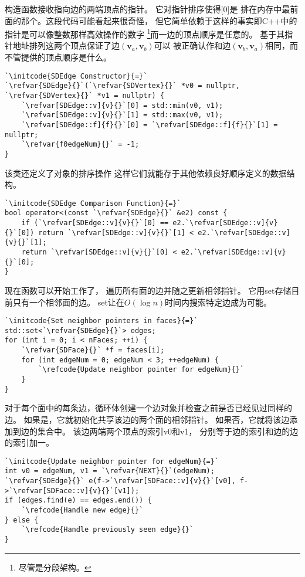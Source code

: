 构造函数接收指向边的两端顶点的指针。
它对指针排序使得{\ttfamily{}[0]}是
排在内存中最前面的那个。这段代码可能看起来很奇怪，
但它简单依赖于这样的事实即C++中的指针是可以像整数那样高效操作的数字
\footnote{尽管是分段架构。}而一边的顶点顺序是任意的。
基于其指针地址排列这两个顶点保证了边$(\bm v_a,\bm v_b)$可以
被正确认作和边$(\bm v_b,\bm v_a)$相同，而不管提供的顶点顺序是什么。
\begin{lstlisting}
`\initcode{SDEdge Constructor}{=}`
`\refvar{SDEdge}{}`(`\refvar{SDVertex}{}` *v0 = nullptr, `\refvar{SDVertex}{}` *v1 = nullptr) {
    `\refvar[SDEdge::v]{v}{}`[0] = std::min(v0, v1);
    `\refvar[SDEdge::v]{v}{}`[1] = std::max(v0, v1);
    `\refvar[SDEdge::f]{f}{}`[0] = `\refvar[SDEdge::f]{f}{}`[1] = nullptr;
    `\refvar{f0edgeNum}{}` = -1;
}
\end{lstlisting}

该类还定义了对象的排序操作
这样它们就能存于其他依赖良好顺序定义的数据结构。
\begin{lstlisting}
`\initcode{SDEdge Comparison Function}{=}`
bool operator<(const `\refvar{SDEdge}{}` &e2) const {
    if (`\refvar[SDEdge::v]{v}{}`[0] == e2.`\refvar[SDEdge::v]{v}{}`[0]) return `\refvar[SDEdge::v]{v}{}`[1] < e2.`\refvar[SDEdge::v]{v}{}`[1];
    return `\refvar[SDEdge::v]{v}{}`[0] < e2.`\refvar[SDEdge::v]{v}{}`[0];
}
\end{lstlisting}

现在函数可以开始工作了，
遍历所有面的边并随之更新相邻指针。
它用{\ttfamily set}存储目前只有一个相邻面的边。
{\ttfamily set}让在$O(\log{n})$时间内搜索特定边成为可能。
\begin{lstlisting}
`\initcode{Set neighbor pointers in faces}{=}`
std::set<`\refvar{SDEdge}{}`> edges;
for (int i = 0; i < nFaces; ++i) {
    `\refvar{SDFace}{}` *f = faces[i];
    for (int edgeNum = 0; edgeNum < 3; ++edgeNum) {
        `\refcode{Update neighbor pointer for edgeNum}{}`
    }
}
\end{lstlisting}

对于每个面中的每条边，循环体创建一个边对象并检查之前是否已经见过同样的边。
如果是，它就初始化共享该边的两个面的相邻指针。
如果否，它就将该边添加到边的集合中。
该边两端两个顶点的索引{\ttfamily v0}和{\ttfamily v1}，
分别等于边的索引和边的边的索引加一。
\begin{lstlisting}
`\initcode{Update neighbor pointer for edgeNum}{=}`
int v0 = edgeNum, v1 = `\refvar{NEXT}{}`(edgeNum);
`\refvar{SDEdge}{}` e(f->`\refvar[SDFace::v]{v}{}`[v0], f->`\refvar[SDFace::v]{v}{}`[v1]);
if (edges.find(e) == edges.end()) {
    `\refcode{Handle new edge}{}`
} else {
    `\refcode{Handle previously seen edge}{}`
}
\end{lstlisting}

